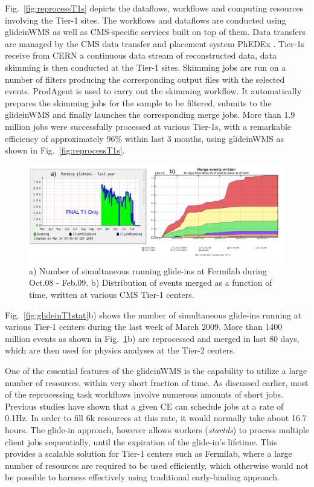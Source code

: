 \documentclass[a4paper]{jpconf}
\begin{document}
Fig.~\ref{fig:reprocessT1s} depicts the dataflows, workflows and computing resources involving the Tier-1 sites.
The workflows and dataflows are conducted using glideinWMS  as well as CMS-specific services 
built on top of them. Data transfers are managed by the CMS data transfer and placement 
system PhEDEx \cite{bib:cms_phedex}. Tier-1s receive from CERN a continuous data stream of reconstructed data, data skimming 
is then conducted at the Tier-1 sites. Skimming jobs are run on a number of filters producing the 
corresponding output files with the selected events. ProdAgent is used to carry out the skimming workflow. 
It automatically prepares the skimming jobs for the sample to be filtered, submits to the glideinWMS and finally
launches the corresponding merge jobs. More than 1.9 million jobs were successfully processed at various 
Tier-1s, with a remarkable efficiency of approximately 96\% within last 3 months, using glideinWMS as shown 
in Fig.~\ref{fig:reprocessT1s}.
\begin{figure}
\begin{center}
\includegraphics[scale=0.55]{merged_events}
\end{center}
\caption{a) Number of simultaneous running glide-ins at Fermilab during Oct.08 - Feb.09. b) Distribution of 
events merged as a function of time, written at various CMS Tier-1 centers.}
\label{fig:merged_events}
\end{figure}
Fig.~\ref{fig:glideinT1stat}b) shows the number of simultaneous glide-ins running at various Tier-1 centers during the last week of March 2009. 
More than 1400 million events as shown in Fig.~\ref{fig:merged_events}b) are reprocessed and merged in last 80 days, which are then 
used for physics analyses at the Tier-2 centers. 

One of the essential features of the glideinWMS is the capability to utilize a large number of
resources, within very short fraction of time. As discussed earlier, most of the reprocessing task 
workflows involve numerous amounts of short jobs. Previous studies have shown that a given CE can 
schedule jobs at a rate of 0.1Hz. In order to fill 6k resources at this rate, it would normally take 
about 16.7 hours.  The glide-in approach, however allows workers (\emph{startds}) 
to process multiple client jobs sequentially, until 
the expiration of the glide-in's lifetime. This provides a scalable solution for Tier-1 centers such as Fermilab, 
where a large number of resources are required to be used efficiently, which otherwise would not 
be possible to harness effectively using traditional early-binding approach.
\end{document}
